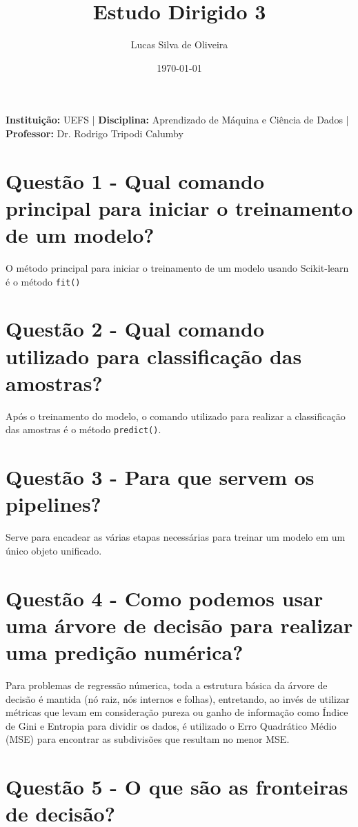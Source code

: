 \documentclass[12pt, a4paper]{article}
\title{\large Estudo Dirigido 3}
\author{\small Lucas Silva de Oliveira}
\date{\small\today}
\begin{document}
\maketitle
\vspace{-0.99cm}  
\begin{center}
\small
\textbf{Instituição:} UEFS \quad | \quad
\textbf{Disciplina:} Aprendizado de Máquina e Ciência de Dados \quad | \quad
\textbf{Professor:} Dr. Rodrigo Tripodi Calumby
\end{center}

\section*{Questão 1 - Qual comando principal para iniciar o treinamento de um modelo?}

O método principal para iniciar o treinamento de um modelo usando Scikit-learn é o método \texttt{fit()}

\section*{Questão 2 - Qual comando utilizado para classificação das amostras?}

Após o treinamento do modelo, o comando utilizado para realizar a classificação das amostras é o método \texttt{predict()}.

\section*{Questão 3 - Para que servem os pipelines?}

Serve para encadear as várias etapas necessárias para treinar um modelo em um único objeto unificado.

\section*{Questão 4 -  Como podemos usar uma árvore de decisão para realizar uma predição numérica?}

Para problemas de regressão númerica, toda a estrutura básica da árvore de decisão é mantida (nó raiz, nós internos e folhas), entretando, ao invés de utilizar métricas que levam em consideração pureza ou ganho de informação como Índice de Gini e Entropia para dividir os dados, é utilizado o Erro Quadrático Médio (MSE) para encontrar as subdivisões que resultam no menor MSE.

\section*{Questão 5 - O que são as fronteiras de decisão?}
\end{document}
